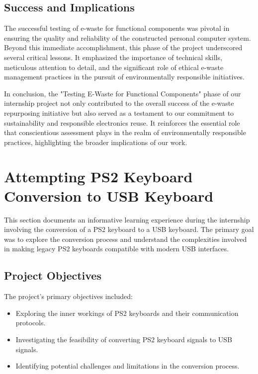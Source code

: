 \subsection{Success and Implications}

The successful testing of e-waste for functional components was pivotal in ensuring the quality and reliability of the constructed personal computer system. Beyond this immediate accomplishment, this phase of the project underscored several critical lessons. It emphasized the importance of technical skills, meticulous attention to detail, and the significant role of ethical e-waste management practices in the pursuit of environmentally responsible initiatives.

In conclusion, the "Testing E-Waste for Functional Components" phase of our internship project not only contributed to the overall success of the e-waste repurposing initiative but also served as a testament to our commitment to sustainability and responsible electronics reuse. It reinforces the essential role that conscientious assessment plays in the realm of environmentally responsible practices, highlighting the broader implications of our work.




\section{Attempting PS2 Keyboard Conversion to USB Keyboard}

This section documents an informative learning experience during the internship involving the conversion of a PS2 keyboard to a USB keyboard. The primary goal was to explore the conversion process and understand the complexities involved in making legacy PS2 keyboards compatible with modern USB interfaces.

\subsection{Project Objectives}

The project's primary objectives included:

\begin{itemize}
  \item Exploring the inner workings of PS2 keyboards and their communication protocols.
  \item Investigating the feasibility of converting PS2 keyboard signals to USB signals.
  \item Identifying potential challenges and limitations in the conversion process.
\end{itemize}

